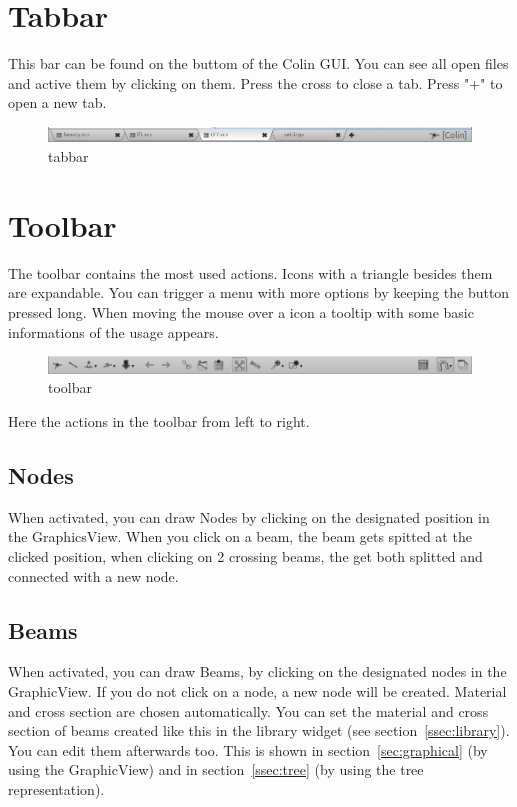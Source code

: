 \documentclass[a4paper,11pt]{report}
\begin{document}
\section{Tabbar}
\label{sec:tabbar}
This bar can be found on the buttom of the Colin GUI. You can see all open files and active them by clicking on them. Press the cross to close a tab. Press "+" to open a new tab.
\begin{figure}[H]
\includegraphics[width=\textwidth]{./pictures/tabbar.png}
\caption{tabbar}
\label{pic:tabbar}
\end{figure}

\section{Toolbar}
\label{sec:toolbar}

The toolbar contains the most used actions. Icons with a triangle besides them are expandable. You can trigger a menu with more options by keeping the button pressed long. When moving the mouse over a icon a tooltip with some basic informations of the usage appears. 

\begin{figure}[H]
\includegraphics[width=\textwidth]{./pictures/toolbar.png}
\caption{toolbar}
\label{pic:toolbar}
\end{figure}

Here the actions in the toolbar from left to right.
\subsection{Nodes}
When activated, you can draw Nodes by clicking on the designated position in the GraphicsView. When you click on a beam, the beam gets spitted at the clicked position, when clicking on 2 crossing beams, the get both splitted and connected with a new node.

\subsection{Beams}
When activated, you can draw Beams, by clicking on the designated nodes in the GraphicView. If you do not click on a node, a new node will be created. Material and cross section are chosen automatically. You can set the material and cross section of beams created like this in the library widget (see section~\ref{ssec:library}). You can edit them afterwards too. This is shown in section~\ref{sec:graphical} (by using the GraphicView) and in section~\ref{ssec:tree} (by using the tree representation).
\end{document}
